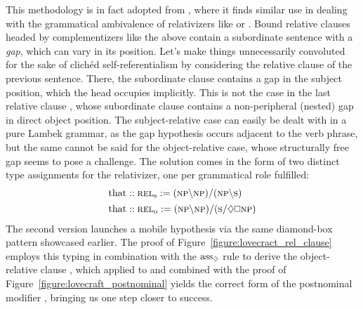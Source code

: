 This methodology is in fact adopted from \citet{moortgat1999constants}, where it finds similar use in dealing with the grammatical ambivalence of relativizers like  or .
Bound relative clauses headed by complementizers like the above contain a subordinate sentence with a \textit{gap}, which can vary in its position.
Let's make things unnecessarily convoluted for the sake of clich{\'e}d self-referentialism by considering the relative clause  of the previous sentence.
There, the subordinate clause  contains a gap in the subject position, which the head  occupies implicitly.
This is not the case in the last relative clause , whose subordinate clause  contains a non-peripheral (nested) gap in direct object position.
The subject-relative case can easily be dealt with in a pure Lambek grammar, as the gap hypothesis occurs adjacent to the verb phrase, but
the same cannot be said for the object-relative case, whose structurally free gap seems to pose a challenge.
The solution comes in the form of two distinct type assignments for the relativizer, one per grammatical role fulfilled:
\begin{align}
	\w{that} &:: \subcat{l}{rel}{s} := (\np\divleft\np)\divright(\np\divleft\s)\\
	\w{that} &:: \subcat{l}{rel}{o} := (\np\divleft\np)\divright(\s\divright\diamond\bx \np ) \label{equation:objrel}
\end{align}
The second version launches a mobile \np[s] hypothesis via the same diamond-box pattern showcased earlier.
The proof of Figure~\ref{figure:lovecract_rel_clause} employs this typing in combination with the $\rulestyle{ass}_{\diamond}$ rule to derive the object-relative clause , which applied to  and combined with the proof of Figure~\ref{figure:lovecraft_postnominal} yields the correct form of the postnominal modifier , bringing us one step closer to success.


